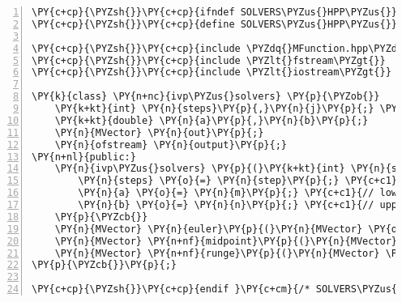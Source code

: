 \begin{Verbatim}[tabsize=2,commandchars=\\\{\},numbers=left,firstnumber=1,stepnumber=1]
\PY{c+cp}{\PYZsh{}}\PY{c+cp}{ifndef SOLVERS\PYZus{}HPP\PYZus{}}
\PY{c+cp}{\PYZsh{}}\PY{c+cp}{define SOLVERS\PYZus{}HPP\PYZus{}}

\PY{c+cp}{\PYZsh{}}\PY{c+cp}{include \PYZdq{}MFunction.hpp\PYZdq{}}
\PY{c+cp}{\PYZsh{}}\PY{c+cp}{include \PYZlt{}fstream\PYZgt{}}
\PY{c+cp}{\PYZsh{}}\PY{c+cp}{include \PYZlt{}iostream\PYZgt{}}

\PY{k}{class} \PY{n+nc}{ivp\PYZus{}solvers} \PY{p}{\PYZob{}}
	\PY{k+kt}{int} \PY{n}{steps}\PY{p}{,}\PY{n}{j}\PY{p}{;} \PY{c+c1}{// variables all functions in the class need}
	\PY{k+kt}{double} \PY{n}{a}\PY{p}{,}\PY{n}{b}\PY{p}{;}
	\PY{n}{MVector} \PY{n}{out}\PY{p}{;}
	\PY{n}{ofstream} \PY{n}{output}\PY{p}{;}
\PY{n+nl}{public:}
	\PY{n}{ivp\PYZus{}solvers} \PY{p}{(}\PY{k+kt}{int} \PY{n}{step}\PY{p}{,} \PY{k+kt}{double} \PY{n}{m}\PY{p}{,} \PY{k+kt}{double} \PY{n}{n}\PY{p}{)}\PY{p}{\PYZob{}}
		\PY{n}{steps} \PY{o}{=} \PY{n}{step}\PY{p}{;} \PY{c+c1}{// number of steps}
		\PY{n}{a} \PY{o}{=} \PY{n}{m}\PY{p}{;} \PY{c+c1}{// lower end of interval}
		\PY{n}{b} \PY{o}{=} \PY{n}{n}\PY{p}{;} \PY{c+c1}{// upper end of interval}
	\PY{p}{\PYZcb{}}
	\PY{n}{MVector} \PY{n}{euler}\PY{p}{(}\PY{n}{MVector} \PY{o}{\PYZam{}}\PY{n}{y}\PY{p}{,} \PY{n}{MFunction} \PY{o}{\PYZam{}}\PY{n}{f}\PY{p}{,} \PY{k+kt}{int} \PY{n}{j}\PY{p}{)}\PY{p}{;}
	\PY{n}{MVector} \PY{n+nf}{midpoint}\PY{p}{(}\PY{n}{MVector} \PY{o}{\PYZam{}}\PY{n}{y}\PY{p}{,} \PY{n}{MFunction} \PY{o}{\PYZam{}}\PY{n}{f}\PY{p}{,} \PY{k+kt}{int} \PY{n}{j}\PY{p}{)}\PY{p}{;}
	\PY{n}{MVector} \PY{n+nf}{runge}\PY{p}{(}\PY{n}{MVector} \PY{o}{\PYZam{}}\PY{n}{y}\PY{p}{,} \PY{n}{MFunction} \PY{o}{\PYZam{}}\PY{n}{f}\PY{p}{,} \PY{k+kt}{int} \PY{n}{j}\PY{p}{)}\PY{p}{;}
\PY{p}{\PYZcb{}}\PY{p}{;}

\PY{c+cp}{\PYZsh{}}\PY{c+cp}{endif }\PY{c+cm}{/* SOLVERS\PYZus{}HPP\PYZus{} */}
\end{Verbatim}
